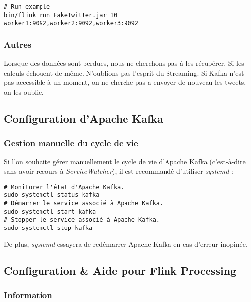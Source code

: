 \documentclass[a4paper,oneside,10pt]{article}
\begin{document}
\begin{verbatim}
# Run example
bin/flink run FakeTwitter.jar 10 worker1:9092,worker2:9092,worker3:9092
\end{verbatim}

\subsubsection{Autres}

Lorsque des données sont perdues, nous ne cherchons pas à les récupérer. Si les calculs échouent de même. N'oublions pas l'esprit du Streaming. 
Si Kafka n'est pas accessible à un moment, on ne cherche pas a envoyer de nouveau les tweets, on les oublie. 



\subsection{Configuration d'Apache Kafka}


\subsubsection{Gestion manuelle du cycle de vie}

Si l'on souhaite gérer manuellement le cycle de vie d'Apache Kafka 
(c'est-à-dire sans avoir recours à \textit{ServiceWatcher}), il est 
recommandé d'utiliser \textit{systemd} :

\begin{verbatim}
# Monitorer l'état d'Apache Kafka.
sudo systemctl status kafka
# Démarrer le service associé à Apache Kafka.
sudo systemctl start kafka
# Stopper le service associé à Apache Kafka.
sudo systemctl stop kafka
\end{verbatim}

De plus, \textit{systemd} essayera de redémarrer Apache Kafka en cas d'erreur
inopinée.

\subsection{Configuration \& Aide pour Flink Processing}



\subsubsection{Information}
\end{document}
